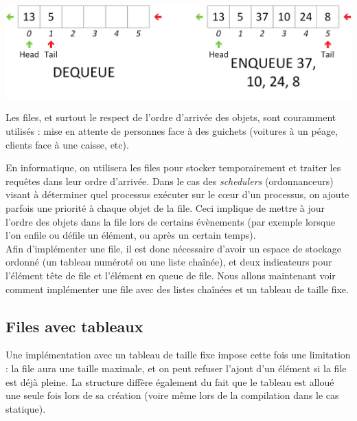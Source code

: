 \documentclass[11pt,a4paper]{article}
\begin{document}
\begin{center}
\includegraphics[scale=0.65]{img/files/Files_2_Structure_Generale_Usage_pack_3.png}
\end{center}

\smallskip

Les files, et surtout le respect de l'ordre d'arrivée des objets, sont couramment utilisés : mise en attente de personnes face à des guichets (voitures à un péage, clients face à une caisse, etc).

En informatique, on utilisera les files pour stocker temporairement et traiter les requêtes dans leur ordre d'arrivée.
Dans le cas des \textit{schedulers} (ordonnanceurs) visant à déterminer quel processus exécuter sur le c\oe{}ur d'un processus, on ajoute parfois une priorité à chaque objet de la file.
Ceci implique de mettre à jour l'ordre des objets dans la file lors de certains évènements (par exemple lorsque l'on enfile ou défile un élément, ou après un certain temps).\\

Afin d'implémenter une file, il est donc nécessaire d'avoir un espace de stockage ordonné (un tableau numéroté ou une liste chaînée), et deux indicateurs pour l'élément tête de file et l'élément en queue de file.
Nous allons maintenant voir comment implémenter une file avec des listes chaînées et un tableau de taille fixe.


\bigskip


\subsection{Files avec tableaux}

\bigskip

Une implémentation avec un tableau de taille fixe impose cette fois une limitation : la file aura une taille maximale, et on peut refuser l'ajout d'un élément si la file est déjà pleine.
La structure diffère également du fait que le tableau est alloué une seule fois lors de sa création (voire même lors de la compilation dans le cas statique).
\end{document}
